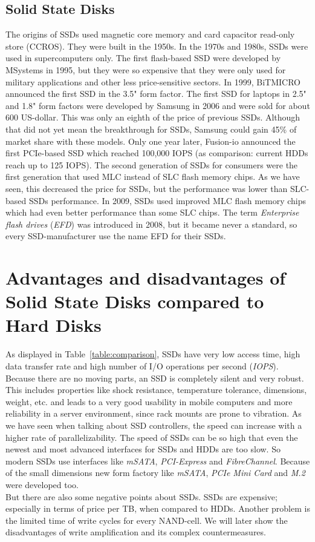 \documentclass{acm_proc_article-sp}
\begin{document}
\subsection{Solid State Disks}
The origins of SSDs used magnetic core memory and card capacitor read-only store (CCROS). %
They were built in the 1950s. In the 1970s and 1980s, SSDs were used in supercomputers only. The first flash-based SSD were developed by MSystems in 1995, but they were so expensive that they were only used for military applications and other less price-sensitive sectors. In 1999, BiTMICRO announced the first SSD in the 3.5" form factor. The first SSD for laptops in 2.5" and 1.8" form factors were developed by Samsung in 2006 and were sold for about 600 US-dollar. This was only an eighth of the price of previous SSDs. Although that did not yet mean the breakthrough for SSDs, Samsung could gain 45\% of market share with these models. Only one year later, Fusion-io announced the first PCIe-based SSD which reached 100,000 IOPS (as comparison: current HDDs reach up to 125 IOPS). The second generation of SSDs for consumers were the first generation that used MLC instead of SLC flash memory chips. As we have seen, this decreased the price for SSDs, but the performance was lower than SLC-based SSDs performance. In 2009, SSDs used improved MLC flash memory chips which had even better performance than some SLC chips. The term \emph{Enterprise flash drives} (\emph{EFD}) was introduced in 2008, but it became never a standard, so every SSD-manufacturer use the name EFD for their SSDs. %

{
\section{Advantages and disadvantages of Solid State Disks compared to Hard Disks}
}
As displayed in Table~\ref{table:comparison}, SSDs have very low access time, high data transfer rate and high number of I/O operations per second (\emph{IOPS}). Because there are no moving parts, an SSD is completely silent and very robust. This includes properties like shock resistance, temperature tolerance, dimensions, weight, etc. and leads to a very good usability in mobile computers and more reliability in a server environment, since rack mounts are prone to vibration. As we have seen when talking about SSD controllers, the speed can increase with a higher rate of parallelizability. The speed of SSDs can be so high that even the newest and most advanced interfaces for SSDs and HDDs are too slow. So modern SSDs use interfaces like \emph{mSATA}, \emph{PCI-Express} and \emph{FibreChannel}. Because of the small dimensions new form factory like \emph{mSATA}, \emph{PCIe Mini Card} and \emph{M.2} were developed too.
\\
But there are also some negative points about SSDs. SSDs are expensive; especially in terms of price per TB, when compared to HDDs. Another problem is the limited time of write cycles for every NAND-cell. We will later show the disadvantages of write amplification and its complex countermeasures.
\end{document}
